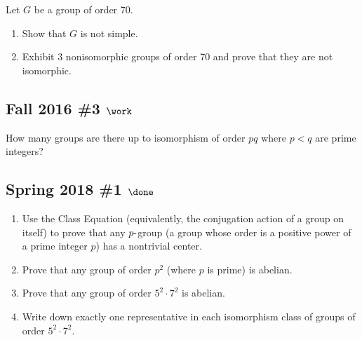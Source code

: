 Let \(G\) be a group of order 70.

\begin{enumerate}
\def\labelenumi{\alph{enumi}.}
\item
  Show that \(G\) is not simple.
\item
  Exhibit 3 nonisomorphic groups of order 70 and prove that they are not
  isomorphic.
\end{enumerate}

\hypertarget{fall-2016-3-work}{%
\subsection{\texorpdfstring{Fall 2016 \#3
\(\work\)}{Fall 2016 \#3 \textbackslash work}}\label{fall-2016-3-work}}

How many groups are there up to isomorphism of order \(pq\) where
\(p<q\) are prime integers?

\hypertarget{spring-2018-1-done}{%
\subsection{\texorpdfstring{Spring 2018 \#1
\(\done\)}{Spring 2018 \#1 \textbackslash done}}\label{spring-2018-1-done}}

\begin{enumerate}
\def\labelenumi{\alph{enumi}.}
\item
  Use the Class Equation (equivalently, the conjugation action of a
  group on itself) to prove that any \(p{\hbox{-}}\)group (a group whose
  order is a positive power of a prime integer \(p\)) has a nontrivial
  center.
\item
  Prove that any group of order \(p^2\) (where \(p\) is prime) is
  abelian.
\item
  Prove that any group of order \(5^2 \cdot 7^2\) is abelian.
\item
  Write down exactly one representative in each isomorphism class of
  groups of order \(5^2 \cdot 7^2\).
\end{enumerate}

